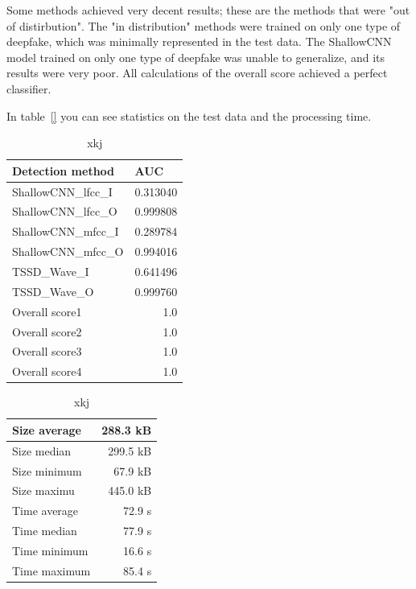 Some methods achieved very decent results; these are the methods that were "out of distirbution". The "in distribution" methods were trained on only one type of deepfake, which was minimally represented in the test data. The ShallowCNN model trained on only one type of deepfake was unable to generalize, and its results were very poor. All calculations of the overall score achieved a perfect classifier.

In table~\ref{} you can see statistics on the test data and the processing time.

\begin{table}[H]
    \begin{minipage}[c]{.5\textwidth}
        \centering
        \begin{tabular}{|l|r|}
            \hline
            Detection method & \multicolumn{1}{l|}{AUC} \\ \hline
            ShallowCNN\_lfcc\_I & 0.313040 \\ \hline
            ShallowCNN\_lfcc\_O & 0.999808 \\ \hline
            ShallowCNN\_mfcc\_I & 0.289784 \\ \hline
            ShallowCNN\_mfcc\_O & 0.994016 \\ \hline
            TSSD\_Wave\_I & 0.641496 \\ \hline
            TSSD\_Wave\_O & 0.999760 \\ \hline
            Overall score1 & 1.0 \\ \hline
            Overall score2 & 1.0 \\ \hline
            Overall score3 & 1.0 \\ \hline
            Overall score4 & 1.0 \\ \hline
        \end{tabular}
        \caption{xkj}
    \end{minipage}
    \begin{minipage}[c]{.5\textwidth}
        \centering
        \begin{tabular}{|l|r|}
            \hline
            Size average & 288.3 kB \\ \hline
            Size median & 299.5 kB \\ \hline
            Size minimum & 67.9 kB \\ \hline
            Size maximu & 445.0 kB \\ \hline
            Time average & 72.9 s \\ \hline
            Time median & 77.9 s \\ \hline
            Time minimum & 16.6 s \\ \hline
            Time maximum & 85.4 s \\ \hline
        \end{tabular}
        \caption{xkj}
    \end{minipage}
\end{table}

